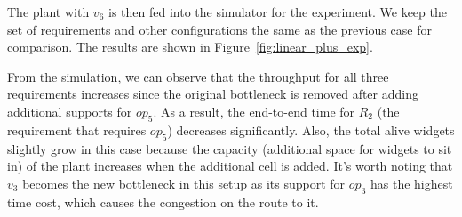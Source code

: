 The plant with $v_6$ is then fed into the simulator for the experiment.
We keep the set of requirements and other configurations the same as the previous case for comparison.
The results are shown in Figure~\ref{fig:linear_plus_exp}.%


From the simulation, we can observe that the throughput for all three requirements increases since the original bottleneck is removed after adding additional supports for $op_5$.
As a result, the end-to-end time for $R_2$ (\ie the requirement that requires $op_5$) decreases significantly.
Also, the total alive widgets slightly grow in this case because the capacity (\ie additional space for widgets to sit in) of the plant increases when the additional cell is added.
It's worth noting that $v_3$ becomes the new bottleneck in this setup as its support for $op_3$ has the highest time cost, which causes the congestion on the route to it.
